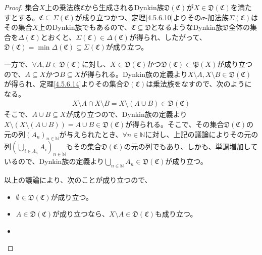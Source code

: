 \documentclass[dvipdfmx]{jsarticle}
\begin{document}
\begin{proof}
集合$X$上の乗法族$\mathfrak{C}$から生成されるDynkin族$\mathfrak{D}\left( \mathfrak{C} \right)$が$X \in \mathfrak{D}\left( \mathfrak{C} \right)$を満たすとする。$\mathfrak{C}\subseteq \varSigma\left( \mathfrak{C} \right)$が成り立つかつ、定理\ref{4.5.6.10}よりその$\sigma$-加法族$\varSigma\left( \mathfrak{C} \right)$はその集合$X$上のDynkin族でもあるので、$\mathfrak{C} \subseteq \mathfrak{D}$となるようなDynkin族$\mathfrak{D}$全体の集合を$\varDelta\left( \mathfrak{C} \right)$とおくと、$\varSigma\left( \mathfrak{C} \right) \in \varDelta\left( \mathfrak{C} \right)$が得られ、したがって、$\mathfrak{D}\left( \mathfrak{C} \right) = \min{\varDelta\left( \mathfrak{C} \right)} \subseteq \varSigma\left( \mathfrak{C} \right)$が成り立つ。\par
一方で、$\forall A,B\in \mathfrak{D}\left( \mathfrak{C} \right)$に対し、$X \in \mathfrak{D}\left( \mathfrak{C} \right)$かつ$\mathfrak{D}\left( \mathfrak{C} \right)\subset \mathfrak{P}(X)$が成り立つので、$A \subseteq X$かつ$B \subseteq X$が得られる。Dynkin族の定義より$X \setminus A,X \setminus B\in \mathfrak{D}\left( \mathfrak{C} \right)$が得られ、定理\ref{4.5.6.14}よりその集合$\mathfrak{D}\left( \mathfrak{C} \right)$は乗法族をなすので、次のようになる。
\begin{align*}
X \setminus A \cap X \setminus B = X \setminus (A \cup B)\in \mathfrak{D}\left( \mathfrak{C} \right)
\end{align*}
そこで、$A \cup B \subseteq X$が成り立つので、Dynkin族の定義より$X \setminus \left( X \setminus (A \cup B) \right) = A \cup B\in \mathfrak{D}\left( \mathfrak{C} \right)$が得られる。そこで、その集合$\mathfrak{D}\left( \mathfrak{C} \right)$の元の列$\left( A_{n} \right)_{n \in \mathbb{N}}$が与えられたとき、$\forall n \in \mathbb{N}$に対し、上記の議論によりその元の列$\left( \bigcup_{i \in \varLambda_{n}} A_{i} \right)_{n \in \mathbb{N}}$もその集合$\mathfrak{D}\left( \mathfrak{C} \right)$の元の列でもあり、しかも、単調増加しているので、Dynkin族の定義より$\bigcup_{n \in \mathbb{N}} A_{n}\in \mathfrak{D}\left( \mathfrak{C} \right)$が成り立つ。\par
以上の議論により、次のことが成り立つので、
\begin{itemize}
\item
  $\mathfrak{\emptyset \in D}\left( \mathfrak{C} \right)$が成り立つ。
\item
  $A \in \mathfrak{D}\left( \mathfrak{C} \right)$が成り立つなら、$X \setminus A \in \mathfrak{D}\left( \mathfrak{C} \right)$も成り立つ。
\item

\end{itemize}
\end{proof}
\end{document}
